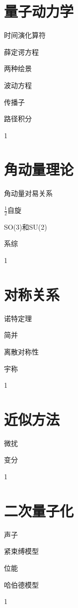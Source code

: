 \documentclass[lang=cn,newtx,10pt,scheme=chinese,thmcnt=section]{elegantbook}
\begin{document}
\chapter{量子动力学}
\begin{introduction}
	\item 时间演化算符
	\item 薛定谔方程
	\item 两种绘景
	\item 波动方程
	\item 传播子
	\item 路径积分
\end{introduction}
1

\chapter{角动量理论}
\begin{introduction}
	\item 角动量对易关系
	\item $\frac12$自旋
	\item SO(3)和SU(2)
	\item 系综
\end{introduction}
1

\chapter{对称关系}
\begin{introduction}
	\item 诺特定理
	\item 简并
	\item 离散对称性
	\item 宇称
\end{introduction}
1

\chapter{近似方法}
\begin{introduction}
	\item 微扰
	\item 变分
\end{introduction}
1

\chapter{二次量子化}
\begin{introduction}
	\item 声子
	\item 紧束缚模型
	\item 位能
	\item 哈伯德模型
\end{introduction}
1
\end{document}
